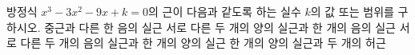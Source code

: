 방정식 $x^3-3x^2-9x+k=0$의 근이 다음과 같도록 하는 실수 $k$의 값 또는 범위를 구하시오.
 중근과 다른 한 음의 실근
 서로 다른 두 개의 양의 실근과 한 개의 음의 실근
 서로 다른 두 개의 음의 실근과 한 개의 양의 실근
 한 개의 양의 실근과 두 개의 허근
